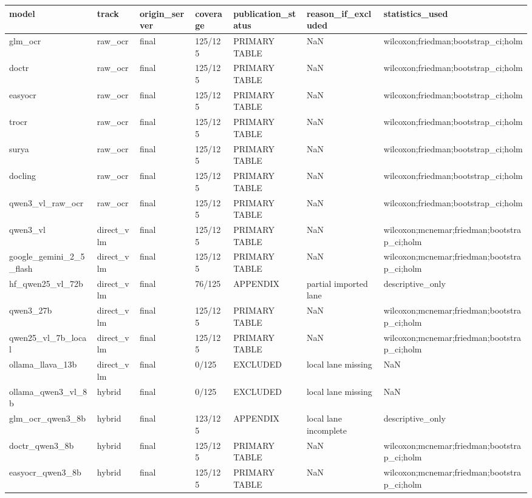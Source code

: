 \begin{tabular}{lllllll}
\toprule
model & track & origin\_server & coverage & publication\_status & reason\_if\_excluded & statistics\_used \\
\midrule
glm\_ocr & raw\_ocr & final & 125/125 & PRIMARY TABLE & NaN & wilcoxon;friedman;bootstrap\_ci;holm \\
doctr & raw\_ocr & final & 125/125 & PRIMARY TABLE & NaN & wilcoxon;friedman;bootstrap\_ci;holm \\
easyocr & raw\_ocr & final & 125/125 & PRIMARY TABLE & NaN & wilcoxon;friedman;bootstrap\_ci;holm \\
trocr & raw\_ocr & final & 125/125 & PRIMARY TABLE & NaN & wilcoxon;friedman;bootstrap\_ci;holm \\
surya & raw\_ocr & final & 125/125 & PRIMARY TABLE & NaN & wilcoxon;friedman;bootstrap\_ci;holm \\
docling & raw\_ocr & final & 125/125 & PRIMARY TABLE & NaN & wilcoxon;friedman;bootstrap\_ci;holm \\
qwen3\_vl\_raw\_ocr & raw\_ocr & final & 125/125 & PRIMARY TABLE & NaN & wilcoxon;friedman;bootstrap\_ci;holm \\
qwen3\_vl & direct\_vlm & final & 125/125 & PRIMARY TABLE & NaN & wilcoxon;mcnemar;friedman;bootstrap\_ci;holm \\
google\_gemini\_2\_5\_flash & direct\_vlm & final & 125/125 & PRIMARY TABLE & NaN & wilcoxon;mcnemar;friedman;bootstrap\_ci;holm \\
hf\_qwen25\_vl\_72b & direct\_vlm & final & 76/125 & APPENDIX & partial imported lane & descriptive\_only \\
qwen3\_27b & direct\_vlm & final & 125/125 & PRIMARY TABLE & NaN & wilcoxon;mcnemar;friedman;bootstrap\_ci;holm \\
qwen25\_vl\_7b\_local & direct\_vlm & final & 125/125 & PRIMARY TABLE & NaN & wilcoxon;mcnemar;friedman;bootstrap\_ci;holm \\
ollama\_llava\_13b & direct\_vlm & final & 0/125 & EXCLUDED & local lane missing & NaN \\
ollama\_qwen3\_vl\_8b & hybrid & final & 0/125 & EXCLUDED & local lane missing & NaN \\
glm\_ocr\_qwen3\_8b & hybrid & final & 123/125 & APPENDIX & local lane incomplete & descriptive\_only \\
doctr\_qwen3\_8b & hybrid & final & 125/125 & PRIMARY TABLE & NaN & wilcoxon;mcnemar;friedman;bootstrap\_ci;holm \\
easyocr\_qwen3\_8b & hybrid & final & 125/125 & PRIMARY TABLE & NaN & wilcoxon;mcnemar;friedman;bootstrap\_ci;holm \\

\end{tabular}

